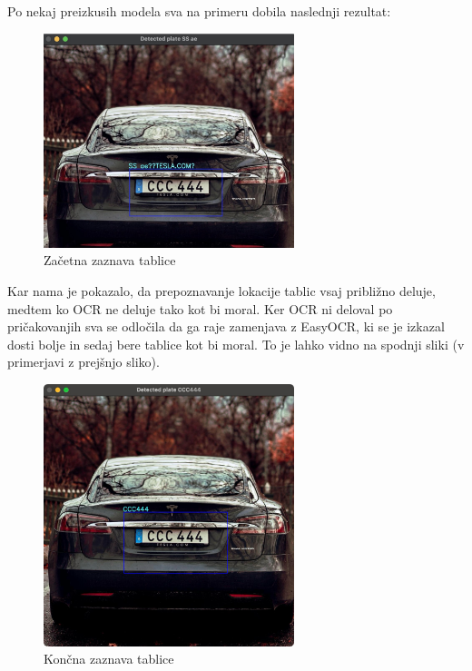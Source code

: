 \documentclass[a4paper,12pt]{article}
\begin{document}
Po nekaj preizkusih modela sva na primeru dobila naslednji rezultat:

\begin{figure}[H]
    \centering
    \includegraphics[width=0.65\textwidth]{img/plate_detection1.jpg}
    \caption{Začetna zaznava tablice}
\end{figure}

Kar nama je pokazalo, da prepoznavanje lokacije tablic vsaj približno deluje, medtem ko OCR ne deluje tako kot bi moral. Ker OCR ni deloval po pričakovanjih sva se odločila da ga raje zamenjava z EasyOCR, ki se je izkazal dosti bolje in sedaj bere tablice kot bi moral. To je lahko vidno na spodnji sliki (v primerjavi z prejšnjo sliko).

\begin{figure}[H]
    \centering
    \includegraphics[width=0.65\textwidth]{img/plate_detection2.jpg}
    \caption{Končna zaznava tablice}
\end{figure}
\end{document}

